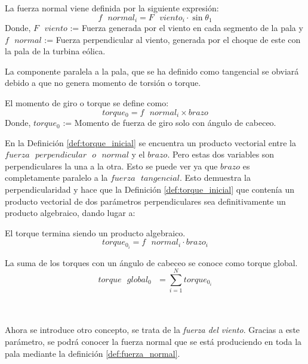  \begin{definicion}
 La fuerza normal viene definida por la siguiente expresión:
  $$ f \text{ } normal_i = F \text{ } viento_i \cdot \sin{\theta_1}$$
Donde,
\centering $F \text{ } viento$ := Fuerza generada por el viento en cada segmento de la pala y $f \text{ } normal$ := Fuerza perpendicular al viento, generada por el choque de este con la pala de la turbina eólica.
 \label{def:fuerza_normal}
 \end{definicion}
 
  La componente paralela a la pala, que se ha definido como tangencial se obviará debido a que no genera momento de torsión o torque. 
  
  \begin{definicion}
El momento de giro o torque se define como:
 $$ torque_0 = f \text{ } normal_i \times brazo$$
Donde,
\centering $torque_0$ := Momento de fuerza de giro solo con ángulo de cabeceo.
  \label{def:torque_inicial}
 \end{definicion}
 

 En la Definición \ref{def:torque_inicial} se encuentra un producto vectorial entre la $fuerza  \text{ }perpendicular \text{ } o \text{ } normal$ y el $brazo$. Pero estas dos variables son perpendiculares la una a la otra. Esto se puede ver ya que $brazo$ es completamente paralelo a la $fuerza \text{ } tangencial$. Esto demuestra la perpendicularidad y hace que la Definición \ref{def:torque_inicial} que contenía un producto vectorial de dos parámetros perpendiculares sea definitivamente un producto algebraico, dando lugar a:
 
 
  \begin{definicion}
  El torque termina siendo un producto algebraico.
 $$ torque_{0_i} = f \text{ } normal_i \cdot brazo_i$$
 \label{def:torque_algebraico_inicial}
 \end{definicion}
 
 
 \begin{definicion}
 La suma de los torques con un ángulo de cabeceo se conoce como torque global.
 $$ torque \text{ } global_0 \text{ } = \sum_{i=1}^{N} torque_0_{i} $$
\label{def:torque_global}
\end{definicion}
 
 \\\\Ahora se introduce otro concepto, se trata de la \textit{fuerza del viento}. Gracias a este parámetro, se podrá conocer la fuerza normal que se está produciendo en toda la pala mediante la definición \ref{def:fuerza_normal}.
 
